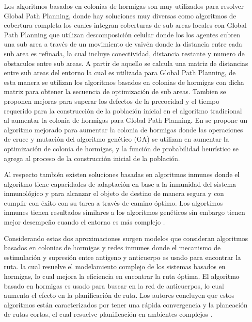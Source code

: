 Los algoritmos basados en colonias de hormigas son muy utilizados para resolver Global Path Planning, donde hay soluciones muy diversas como algoritmos de cobertura completa los cuales integran coberturas de sub areas locales con Global Path Planning \cite{Zang08} que utilizan descomposici\'on celular  donde los los agentes cubren una sub area a trav\'es de un movimiento de vaiv\'en donde la distancia entre cada sub area es refinada, la cual incluye conectividad, distancia restante y numero de obstaculos entre sub areas. A partir de aquello se calcula una matriz de distancias entre sub areas del entorno la cual es utilizada para Global Path Planning, de esta manera se utilizan los algoritmos basados en colonias de hormigas con dicha matriz para obtener la secuencia de optimizaci\'on de sub areas. Tambien se proponen mejoras para superar los defectos de la precocidad y el tiempo requerido para la construcci\'on  de la poblaci\'on inicial en el algoritmo tradicional al aumentar la colonia de hormigas para Global Path Planning. En \cite{Meijuan08} se propone un algoritmo mejorado para aumentar la colonia de hormigas donde las operaciones de cruce y mutaci\'on del algoritmo gen\'etico (GA) se utilizan en aumentar la optimizaci\'on de colonia de hormigas, y la funci\'on de probabilidad heur\'istico se agrega al proceso de la construcci\'on inicial de la poblaci\'on.


Al respecto tambi\'en existen soluciones basadas en algoritmos inmunes donde el algoritmo tiene capacidades de adaptaci\'on en base a la inmunidad del sistema inmunol\'ogico y para alcanzar el objeto de destino de manera segura y con cumplir con \'exito con su tarea a trav\'es de camino \'optimo. Los algortimos inmunes tienen resultados similares a los algoritmos gen\'eticos sin embargo tienen mejor desempe\~no cuando el entorno es m\'as complejo \cite{Xuanzi07} .

Considerando estas dos aproximaciones surgen modelos que consideran algoritmos basados en colonias de hormigas y redes inmunes \cite{Mingxin08}  donde el mecanismo de estimulaci\'on y supresi\'on entre ant\'igeno y anticuerpo es usado para encontrar la ruta. la cual resuelve el modelamiento complejo de los sistemas basados en hormigas, lo cual mejora la eficiencia en encontrar la ruta \'optima. El algoritmo basado en hormigas es usado para buscar en la red de anticuerpos, lo cual aumenta el efecto en la planificaci\'on de ruta. Los autores concluyen que estos algoritmos est\'an caracterizados por tener una r\'apida convergencia y la planeaci\'on de rutas cortas, el cual resuelve planificaci\'on en ambientes complejos \cite{Mingxin08}.
